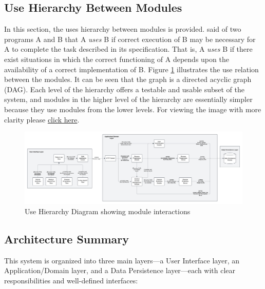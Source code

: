 \documentclass[12pt, titlepage]{article}
\begin{document}
\begin{landscape}
\section{Use Hierarchy Between Modules} \label{SecUse}
In this section, the uses hierarchy between modules is
provided. \citet{Parnas1978} said of two programs A and B that A {\em uses} B if
correct execution of B may be necessary for A to complete the task described in
its specification. That is, A {\em uses} B if there exist situations in which
the correct functioning of A depends upon the availability of a correct
implementation of B.  Figure \ref{FigUH} illustrates the use relation between
the modules. It can be seen that the graph is a directed acyclic graph
(DAG). Each level of the hierarchy offers a testable and usable subset of the
system, and modules in the higher level of the hierarchy are essentially simpler
because they use modules from the lower levels. For viewing the image with more clarity please \href{https://github.com/RezaJodeiri/CXR-Capstone/blob/nathan/doc/design/docs/assets/ContextDesignFlow.png}{click here}.
\begin{figure}[H]
\centering
\includegraphics[width=1.45\textwidth]{../../assets/ContextDesignFlow.png}
\caption{Use Hierarchy Diagram showing module interactions}
\label{FigUH}
\end{figure}
\end{landscape}
\subsection{Architecture Summary}
\noindent This system is organized into three main layers---a User Interface layer, an Application/Domain layer, and a Data Persistence layer---each with clear responsibilities and well-defined interfaces:
\end{document}
